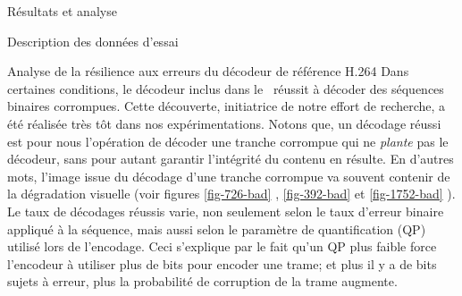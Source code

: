 \begin{chapter}{Résultats et analyse}
\begin{section}{Description des données d'essai}
\FloatBarrier
\end{section}

\begin{section}{Analyse de la résilience aux erreurs du décodeur de référence H.264}
\label{sec-ResilienceDecodeur}
Dans certaines conditions, le décodeur inclus dans le \ltCodec~réussit à décoder
des séquences binaires corrompues. Cette découverte, initiatrice de notre effort
de recherche, a été réalisée très tôt dans nos expérimentations. Notons que, un
décodage réussi est pour nous l'opération de décoder une tranche corrompue qui
ne \textit{plante} pas le décodeur, sans pour autant garantir l'intégrité du
contenu en résulte. En d'autres mots, l'image issue du décodage d'une tranche
corrompue va souvent contenir de la dégradation visuelle (voir figures
\ref{fig-726-bad} , \ref{fig-392-bad}  et
\ref{fig-1752-bad} ). Le taux de décodages réussis varie, non
seulement selon le taux d'erreur binaire appliqué à la séquence, mais aussi
selon le paramètre de quantification (QP) utilisé lors de l'encodage. Ceci
s'explique par le fait qu'un QP plus faible force l'encodeur à utiliser plus de
bits pour encoder une trame; et plus il y a de bits sujets à erreur, plus la
probabilité de corruption de la trame augmente.


\end{section}
\end{chapter}
